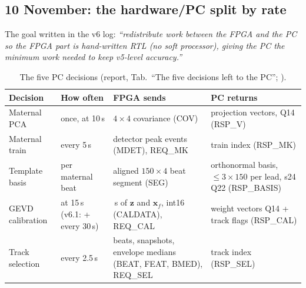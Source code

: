 \documentclass[11pt]{article}
\begin{document}
\subsection{10 November: the hardware/PC split by rate}
The goal written in the v6 log: \emph{``redistribute work between the FPGA and the PC so the FPGA part is hand-written RTL (no soft processor), giving the PC the minimum work needed to keep v5-level accuracy.''}

\begin{tried}
\end{tried}

\begin{table}[H]
\centering\small
\begin{tabularx}{\linewidth}{@{}>{\raggedright\arraybackslash}p{2.4cm}>{\raggedright\arraybackslash}p{2.5cm}>{\raggedright\arraybackslash}X>{\raggedright\arraybackslash}X@{}}
\toprule
\textbf{Decision} & \textbf{How often} & \textbf{FPGA sends} & \textbf{PC returns} \\
\midrule
Maternal PCA & once, at 10\,s & $4\times4$ covariance (COV) & 4 projection vectors, Q14 (RSP\_V) \\
Maternal train & every 5\,s & detector peak events (MDET), REQ\_MK & train index (RSP\_MK) \\
Template basis & per maternal beat & aligned $150\times4$ beat segment (SEG) & orthonormal basis, $\le 3\times150$ per lead, s24 Q22 (RSP\_BASIS) \\
GEVD calibration & at 15\,s (v6.1: + every 30\,s) & 12\,s of $\mathbf{z}$ and $\mathbf{x}_f$, int16 (CALDATA), REQ\_CAL & 16 weight vectors Q14 + track flags (RSP\_CAL) \\
Track selection & every 2.5\,s & beats, snapshots, envelope medians (BEAT, FEAT, BMED), REQ\_SEL & track index (RSP\_SEL) \\
\bottomrule
\end{tabularx}
\caption{The five PC decisions (report, Tab.\ ``The five decisions left to the PC''; ).}
\label{tab:five}
\end{table}
\end{document}
